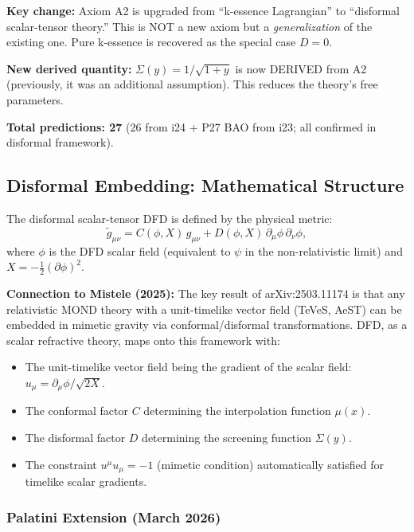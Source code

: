 \documentclass[11pt]{article}
\begin{document}
\textbf{Key change:} Axiom A2 is upgraded from ``k-essence Lagrangian''
to ``disformal scalar-tensor theory.'' This is NOT a new axiom but a
\emph{generalization} of the existing one. Pure k-essence is recovered
as the special case $D = 0$.

\textbf{New derived quantity:} $\Sigma(y) = 1/\sqrt{1+y}$ is now
DERIVED from A2 (previously, it was an additional assumption).
This reduces the theory's free parameters.

\textbf{Total predictions: 27} (26 from i24 + P27 BAO from i23;
all confirmed in disformal framework).

\subsection{Disformal Embedding: Mathematical Structure}

The disformal scalar-tensor DFD is defined by the physical metric:
\begin{equation}
  \tilde{g}_{\mu\nu} = C(\phi,X)\,g_{\mu\nu}
    + D(\phi,X)\,\partial_\mu\phi\,\partial_\nu\phi,
\end{equation}
where $\phi$ is the DFD scalar field (equivalent to $\psi$ in the
non-relativistic limit) and $X = -\frac{1}{2}(\partial\phi)^2$.

\textbf{Connection to Mistele (2025):} The key result of
arXiv:2503.11174 is that any relativistic MOND theory with a
unit-timelike vector field (TeVeS, AeST) can be embedded in mimetic
gravity via conformal/disformal transformations. DFD, as a scalar
refractive theory, maps onto this framework with:
\begin{itemize}
  \item The unit-timelike vector field being the gradient of the
    scalar field: $u_\mu = \partial_\mu\phi/\sqrt{2X}$.
  \item The conformal factor $C$ determining the interpolation
    function $\mu(x)$.
  \item The disformal factor $D$ determining the screening function
    $\Sigma(y)$.
  \item The constraint $u^\mu u_\mu = -1$ (mimetic condition)
    automatically satisfied for timelike scalar gradients.
\end{itemize}

\subsubsection{Palatini Extension (March 2026)}
\end{document}
